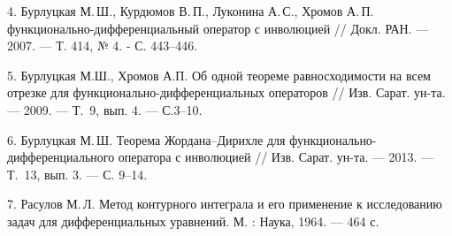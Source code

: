 4. Бурлуцкая М.\,Ш., Курдюмов В.\,П.,  Луконина А.\,С.,  Хромов А.\,П.
фу\-н\-к\-ци\-о\-нально-дифференциальный оператор с инволюцией  // Докл. РАН.
--- 2007. --- Т. 414, № 4. - С. 443--446.

5.  Бурлуцкая М.Ш., Хромов А.П.  Об одной теореме равносходимости на
всем отрезке для функционально-диф\-фе\-рен\-циаль\-ных операторов
// Изв. Сарат. ун-та.   --- 2009. --- Т.~9, вып. 4. --- С.3--10.

6. Бурлуцкая М.\,Ш. Теорема Жордана--Дирихле для
фу\-н\-к\-ци\-о\-нально-дифференциального оператора с инволюцией // Изв.
Сарат. ун-та.  --- 2013. --- Т.~13, вып. 3. --- С. 9--14.

7. Расулов М.\,Л. Метод контурного интеграла и его применение к
исследованию задач для дифференциальных ура\-в\-нений.   М. : Наука,
1964. --- 464 с.
